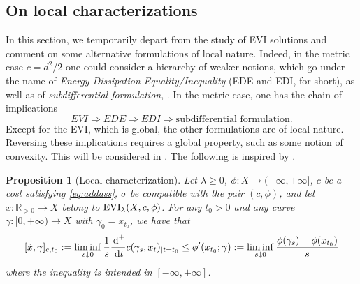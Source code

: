 \documentclass[reqno]{amsart}
\newcounter{results}[section]
\theoremstyle{plain}
\newtheorem{proposition}[results]{Proposition}
\theoremstyle{remark}
\theoremstyle{plain}
\numberwithin{equation}{section}
\theoremstyle{remark}
\newcommand{\R}{\mathbb{R}}
\newcommand{\de}{{\,\rm d}}
\DeclareMathOperator{\EVI}{{\rm EVI}}
\begin{document}
\subsection{On local characterizations}\label{sec:slope_local}

 In this section, we temporarily depart from the study of EVI  solutions and comment on some alternative formulations of local nature. Indeed, in the metric case $c=d^2/2$ one could consider a hierarchy of weaker notions, which go under the name of {\it Energy-Dissipation Equality/Inequality} (EDE and EDI, for short), as well as of {\it subdifferential formulation}, \cite{Ambrosio2012userguide}. In the metric case, one has the 
chain of implications \cite[Section 3.2]{Ambrosio2012userguide}
\begin{equation*}
    EVI \Rightarrow EDE \Rightarrow EDI \Rightarrow \text{subdifferential formulation}.
\end{equation*}
Except for the EVI, which is global,  the other formulations are of local nature.  Reversing these implications requires  a global property, such as some notion of convexity. This will be considered in .
The following is inspired by \cite[Proposition 3.11]{MuratoriSavare}. 

\begin{proposition}[Local characterization]\label{prop:evi_local_1}  Let $\lambda \ge 0$, $\phi:X\to (-\infty, + \infty]$, $c$ be a cost satisfying \eqref{eq:addass}, 
$\sigma$ be compatible with the pair $(c,\phi)$, and let $x:\R_{>0} \to X$ belong to $ \EVI_\lambda(X,c,\phi)$.  For any  $t_0>0$ and any curve $\gamma :[0,+\infty) \to X$ with $\gamma_0=  x_{t_0}$, we have that
    \begin{equation}\label{eq:evi_local}
    [\dot x, \gamma]_{c,t_0}:= \liminf_{s\downarrow 0} \frac{1}{s} \frac{\de^+}{\de t} c(\gamma_s, x_t)_{|t=t_0} \le \phi'(x_{            t_0};\gamma):= \liminf_{s\downarrow 0} \frac{\phi(\gamma_s)-\phi(x_{t_0})}{s}
    \end{equation}
    where the inequality is intended in $[-\infty,+\infty]$.
\end{proposition}
\end{document}
